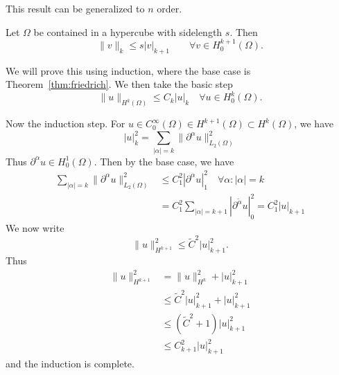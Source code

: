 This result can be generalized to $n$ order. 

\begin{cor}
    Let $\Omega$ be contained in a hypercube with sidelength $s$. Then 
\begin{equation*}
    \| v \|_{k} \leq s |v|_{k+1} \quad \quad \forall v \in H_0^{k+1}(\Omega).
\end{equation*}\label{thm:friedrich}
\vspace{-8mm}
\end{cor}
\begin{bev}
We will prove this using induction, where the base case is Theorem~\ref*{thm:friedrich}.
We then take the basic step
\begin{equation*}
    \|u\|_{ H^k (\Omega)} \leq C_k |u|_k \quad \forall u \in H_0^k (\Omega).
\end{equation*}

Now the induction step. For $u\in C^{\infty}_0(\Omega)\in H^{k+1}(\Omega)\subset H^k(\Omega)$, we have
\begin{equation}
    |u|^2_k = \sum_{|\alpha| = k} \|\partial^\alpha u\|_{L_2(\Omega)}^2
\end{equation}
Thus $\partial^\alpha u \in H^1_0(\Omega)$. Then by the base case, we have
\begin{equation}
    \begin{split}
        \sum_{|\alpha|=k} \|\partial^\alpha u\|^2_{L_2(\Omega)} &\leq C_1^2 |\partial^\alpha u|_1^2 \quad \forall \alpha : |\alpha|=k \\
        &= C^2_1 \sum_{|\alpha|=k+1} |\partial^{\tilde{\alpha}} u |^2_0 = C_1^2 |u|_{k+1}
    \end{split}
\end{equation}  
We now write
\begin{equation}
    \|u\|^2_{H^{k+1}} \leq \tilde{C}^2 |u|^2_{k+1}.
\end{equation}
Thus
\begin{align*}
    \|u\|^2_{H^{k+1}} &=\|u\|^2_{H^k} + |u|^2_{k+1} \\
    &\leq \tilde{C}^2|u|^2_{k+1} + |u|^2_{k+1} \\
    &\leq (\tilde{C}^2 + 1)|u|^2_{k+1} \\
    &\leq C_{k+1}^2 |u|^2_{k+1}
\end{align*}
and the induction is complete.
\end{bev}